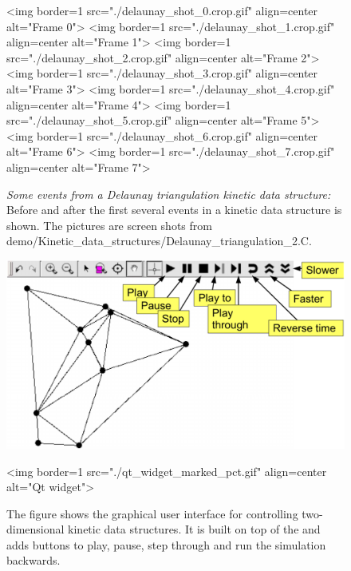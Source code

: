 \begin{figure}[htb]
\begin{ccTexOnly}
\begin{center}
\end{center}
\end{ccTexOnly}
\begin{ccHtmlOnly}
<img border=1 src="./delaunay_shot_0.crop.gif" align=center alt="Frame 0">
<img border=1 src="./delaunay_shot_1.crop.gif" align=center alt="Frame 1">
<img border=1 src="./delaunay_shot_2.crop.gif" align=center alt="Frame 2">
<img border=1 src="./delaunay_shot_3.crop.gif" align=center alt="Frame 3">
<img border=1 src="./delaunay_shot_4.crop.gif" align=center alt="Frame 4">
<img border=1 src="./delaunay_shot_5.crop.gif" align=center alt="Frame 5">
<img border=1 src="./delaunay_shot_6.crop.gif" align=center alt="Frame 6">
<img border=1 src="./delaunay_shot_7.crop.gif" align=center alt="Frame 7">
\end{ccHtmlOnly}
\caption{ \label{fig:delaunay_events} 
{\em Some events from a Delaunay triangulation kinetic data
structure:} Before and after the first several events in a kinetic
data structure is shown. The pictures are screen shots from
demo/Kinetic\_data\_structures/Delaunay\_triangulation\_2.C. }
\end{figure}


\begin{figure}
\begin{ccTexOnly}
\begin{center}
\includegraphics[scale=.5]{Kinetic_data_structures/qt_widget_marked_pct}
\end{center}
\end{ccTexOnly}
\begin{ccHtmlOnly}
<img border=1 src="./qt_widget_marked_pct.gif" align=center alt="Qt widget">
\end{ccHtmlOnly}
\caption{\label{qtwidget_capture} The figure shows the graphical user interface for
  controlling two-dimensional kinetic data structures. It is built on
  top of the  and adds buttons to play, pause, step
  through and run the simulation backwards.}
\end{figure}

